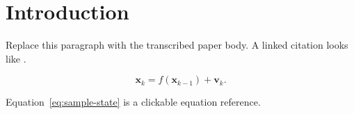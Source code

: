 \section{Introduction}

Replace this paragraph with the transcribed paper body. A linked citation looks like .

\begin{equation}
  \bm{x}_k = f(\bm{x}_{k-1}) + \bm{v}_k.
  \tag{1}\label{eq:sample-state}
\end{equation}

Equation~\eqref{eq:sample-state} is a clickable equation reference.
